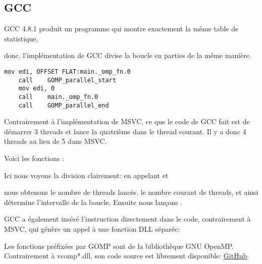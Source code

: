 \subsection{GCC}

GCC 4.8.1 produit un programme qui montre exactement la même table de statistique,

donc, l'implémentation de GCC divise la boucle en parties de la même manière.

\begin{lstlisting}[caption=GCC 4.8.1,style=customasmx86]
	mov	edi, OFFSET FLAT:main._omp_fn.0
	call	GOMP_parallel_start
	mov	edi, 0
	call	main._omp_fn.0
	call	GOMP_parallel_end
\end{lstlisting}

Contrairement à l'implémentation de MSVC, ce que le code de GCC fait est de démarrer
3 threads et lance la quatrième dans le thread courant. Il y a donc 4 threads au
lieu de 5 dans MSVC.

Voici les fonctions :



Ici nous voyons la division clairement: en appelant
 et 

nous obtenons le nombre de threads lancés, le nombre courant de threads,
et ainsi détermine l'intervalle de la boucle.
Ensuite nous lançons .

GCC a également inséré l'instruction  directement dans le code, contrairement
à MSVC, qui génère un appel à une fonction DLL séparée:



Les fonctions préfixées par GOMP sont de la bibliothèque GNU OpenMP.
Contrairement à vcomp*.dll, son code source est librement disponible:
\href{http://go.yurichev.com/17102}{GitHub}.
